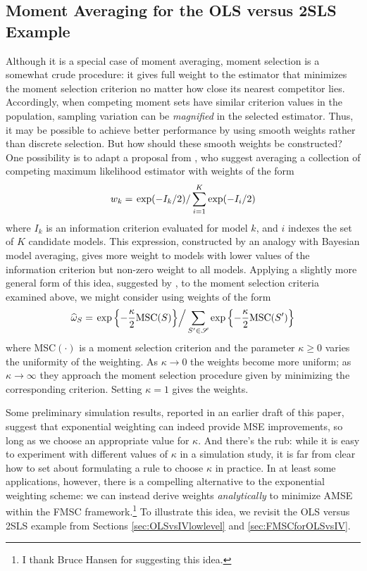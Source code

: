 \subsection{Moment Averaging for the OLS versus 2SLS Example}
Although it is a special case of moment averaging, moment selection is a somewhat crude procedure: it gives full weight to the estimator that minimizes the moment selection criterion no matter how close its nearest competitor lies. 
Accordingly, when competing moment sets have similar criterion values in the population, sampling variation can be \emph{magnified} in the selected estimator. 
Thus, it may be possible to achieve better performance by using smooth weights rather than discrete selection.
But how should these smooth weights be constructed?
One possibility is to adapt a proposal from \cite{Burnhametal}, who suggest averaging a collection of competing maximum likelihood estimator with weights of the form 
\[w_k =\left. \exp(-I_k/2)\right/\sum_{i=1}^K \exp(-I_i/2)\] 
where $I_k$ is an information criterion evaluated for model $k$, and $i$ indexes the set of $K$ candidate models. 
This expression, constructed by an analogy with Bayesian model averaging, gives more weight to models with lower values of the information criterion but non-zero weight to all models. 
Applying a slightly more general form of this idea, suggested by \cite{ClaeskensHjortbook}, to the moment selection criteria examined above, we might consider using weights of the form	
\[		\widehat{\omega}_S = \left.\exp\left\{-\frac{\kappa}{2} \mbox{MSC}(S)\right\}\right/\sum_{S' \in \mathscr{S}}\exp\left\{-\frac{\kappa}{2} \mbox{MSC}(S')\right\}\]
where MSC$(\cdot)$ is a moment selection criterion and the parameter $\kappa \geq 0$ varies the uniformity of the weighting. 
As $\kappa \rightarrow 0$ the weights become more uniform; as $\kappa \rightarrow \infty$ they approach the moment selection procedure given by minimizing the corresponding criterion. 
Setting $\kappa = 1$ gives the \cite{Burnhametal} weights.

Some preliminary simulation results, reported in an earlier draft of this paper, suggest that exponential weighting can indeed provide MSE improvements, so long as we choose an appropriate value for $\kappa$.
And there's the rub: while it is easy to experiment with different values of $\kappa$ in a simulation study, it is far from clear how to set about formulating a rule to choose $\kappa$ in practice. In at least some applications, however, there is a compelling alternative to the exponential weighting scheme: we can instead derive weights \emph{analytically} to minimize AMSE within the FMSC framework.\footnote{I thank Bruce Hansen for suggesting this idea.} 
To illustrate this idea, we revisit the OLS versus 2SLS example from Sections \ref{sec:OLSvsIVlowlevel} and \ref{sec:FMSCforOLSvsIV}. 

